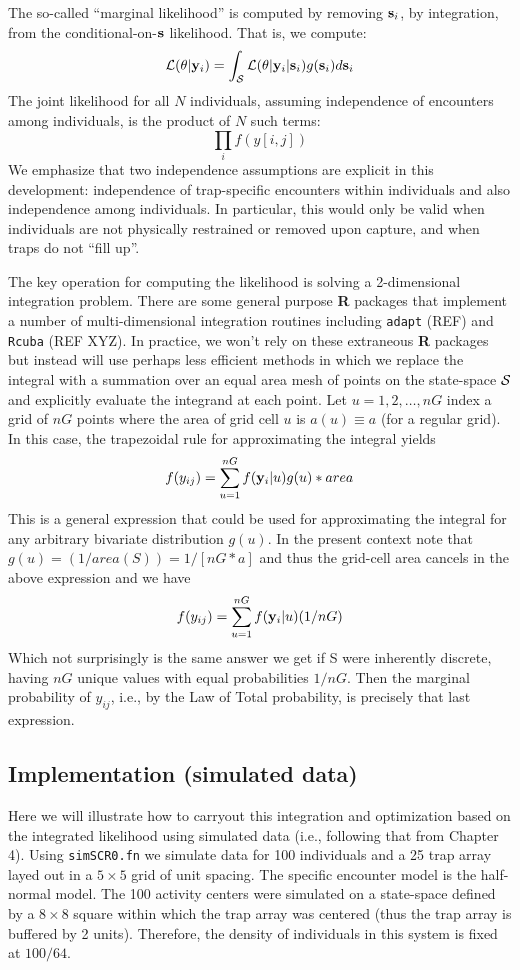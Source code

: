  The so-called ``marginal likelihood'' is computed by removing
${\bf s}_{i}$, by integration, from the conditional-on-${\bf s}$ likelihood. That
is, we compute:
\[
         {\cal L}(\theta| {\bf y}_{i}) = 
\int_{{\cal S}} {\cal L}( \theta | {\bf y}_{i} |{\bf s}_{i}) g({\bf s}_{i}) d{\bf s}_{i}
\]
The joint likelihood for all $N$ individuals, assuming independence of
encounters among individuals, is the product of $N$ such terms:
\[
          \prod_{i}  f(y[i,j])
\]
We emphasize that two independence assumptions are explicit in this
development: independence of trap-specific encounters within
individuals and also independence among individuals. In particular,
this would only be valid when individuals are not physically
restrained or removed upon capture, and when traps do not “fill up”.

The key operation for computing the likelihood is solving a
2-dimensional integration problem. There are some general purpose {\bf
  R} packages that implement a number of 
 multi-dimensional integration routines
including \mbox{\tt adapt} (REF) and \mbox{\tt Rcuba} (REF XYZ). In practice, we won’t rely
on these extraneous {\bf R} packages but instead will use perhaps less
efficient methods in which we replace the integral with a summation
over an equal area mesh of points on the state-space ${\cal S}$ and explicitly
evaluate the integrand at each point. Let $u=1,2,\ldots,nG$ index a grid of
$nG$ points where the area of grid cell $u$ is $a(u) \equiv a$ (for a regular grid).
In this case, the trapezoidal rule
for approximating the integral yields
\[
          f(y_{ij}) = \sum_{u=1}^{nG}  f( {\bold y}_{i} |u) g(u) *area
\]
This is a general expression that could be used
for approximating the integral for any arbitrary bivariate
distribution $g(u)$. In the present context note that $g(u) = (1/area(S))
= 1/[nG*a]$ and thus the grid-cell area cancels in the above
expression and we have
\[
          f(y_{ij}) = \sum_{u=1}^{nG}  f( {\bold y}_{i} |u) (1/nG)
\]
Which not surprisingly is the same answer we get if {\cal S} were inherently
discrete, having $nG$ unique values with equal probabilities $1/nG$. Then
the marginal probability of $y_{ij}$, i.e., by the Law of Total
probability, is precisely that last expression.

\subsection{ Implementation (simulated data)}

Here we will illustrate how to carryout this integration and
optimization based on the integrated likelihood using simulated data
 (i.e., following that from Chapter 4). Using \mbox{\tt simSCR0.fn}
 we simulate data for 100 individuals and a 25 trap array
layed out in a $5 \times 5$ grid of unit spacing.  The specific encounter
model is the half-normal model. The 100 activity centers were
simulated on a state-space defined by a $8 \times 8$ square 
within which the
trap array was centered (thus the trap array is buffered by 2
units). Therefore, the density of individuals in this system is fixed
at $100/64$.

